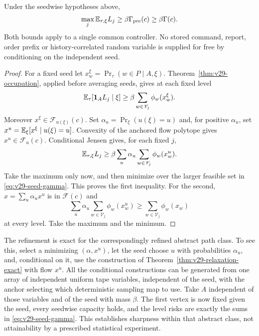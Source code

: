 \begin{theorem}\label{thm:v29-pre}
Under the seedwise hypotheses above,
\begin{equation}\label{eq:v29-pre-risk}
        \max_j\mathbb E_{\tau,\xi}L_j
                \ge\beta\Gamma_{\rm pre}(c)
                \ge\beta\Gamma(c).
\end{equation}
Both bounds apply to a single common controller. No stored command,
report, order prefix or history-correlated random variable is supplied
for free by conditioning on the independent seed.
\end{theorem}
\begin{proof}
For a fixed seed let $x^\xi_w=\Pr_\tau(w\in P\mid A,\xi)$.
Theorem~\ref{thm:v29-occupation}, applied before averaging seeds, gives
at each fixed level
\[
 \mathbb E_\tau[\mathbf1_A L_j\mid\xi]
                 \ge\beta\sum_{w\in\mathscr V_j}\phi_w(x^\xi_w).
\]
Moreover $x^\xi\in\mathcal F_{u(\xi)}(c)$. Set
$\alpha_u=\Pr_\xi(u(\xi)=u)$ and, for positive $\alpha_u$, set
$x^u=\mathbb E_\xi[x^\xi\mid u(\xi)=u]$. Convexity of the anchored flow
polytope gives $x^u\in\mathcal F_u(c)$. Conditional Jensen gives,
for each fixed $j$,
\[
 \mathbb E_{\tau,\xi}L_j
 \ge\beta\sum_u\alpha_u\sum_{w\in\mathscr V_j}\phi_w(x^u_w).
\]
Take the maximum only now, and then minimize over the larger feasible
set in \eqref{eq:v29-seed-gamma}. This proves the first inequality.
For the second, $x=\sum_u\alpha_u x^u$ is in $\mathcal F(c)$ and
\[
 \sum_u\alpha_u\sum_{w\in\mathscr V_j}\phi_w(x^u_w)
                   \ge\sum_{w\in\mathscr V_j}\phi_w(x_w)
\]
at every level. Take the maximum and the minimum.
\end{proof}

The refinement is exact for the correspondingly refined abstract path
class. To see this, select a minimizing $(\alpha,x^u)$, let the seed
choose $u$ with probabilities $\alpha_u$, and, conditional on it, use
the construction of Theorem~\ref{thm:v29-relaxation-exact} with flow
$x^u$. All the conditional constructions can be generated from one array of
independent uniform tape variables, independent of the seed, with the
anchor selecting which deterministic sampling map to use. Take $A$
independent of those variables and of the seed with mass $\beta$. The first
vertex is now fixed given the seed, every seedwise capacity holds, and
the level risks are exactly the sums in \eqref{eq:v29-seed-gamma}.
This establishes sharpness within that abstract class, not
attainability by a prescribed statistical experiment.

